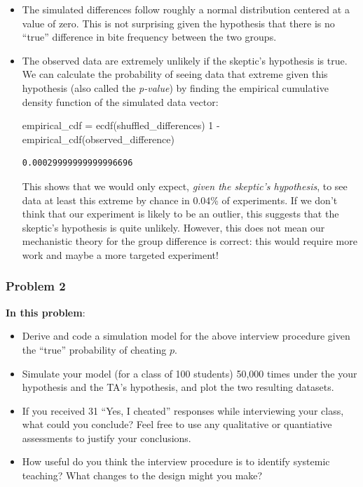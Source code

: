 \documentclass[
  letterpaper,
  DIV=11,
  numbers=noendperiod]{scrartcl}
\newenvironment{Shaded}{\begin{snugshade}}{\end{snugshade}}
\newcommand{\FloatTok}[1]{\textcolor[rgb]{0.68,0.00,0.00}{#1}}
\newcommand{\FunctionTok}[1]{\textcolor[rgb]{0.28,0.35,0.67}{#1}}
\newcommand{\NormalTok}[1]{\textcolor[rgb]{0.00,0.23,0.31}{#1}}
\newcommand{\OperatorTok}[1]{\textcolor[rgb]{0.37,0.37,0.37}{#1}}
\providecommand{\tightlist}{%
  \setlength{\itemsep}{0pt}\setlength{\parskip}{0pt}}\usepackage{longtable,booktabs,array}
\begin{document}
\begin{itemize}
\item
  The simulated differences follow roughly a normal distribution
  centered at a value of zero. This is not surprising given the
  hypothesis that there is no ``true'' difference in bite frequency
  between the two groups.
\item
  The observed data are extremely unlikely if the skeptic's hypothesis
  is true. We can calculate the probability of seeing data that extreme
  given this hypothesis (also called the \emph{p-value}) by finding the
  empirical cumulative density function of the simulated data vector:

\begin{Shaded}
\begin{Highlighting}[]
\NormalTok{empirical\_cdf }\OperatorTok{=} \FunctionTok{ecdf}\NormalTok{(shuffled\_differences)}
\FloatTok{1} \OperatorTok{{-}} \FunctionTok{empirical\_cdf}\NormalTok{(observed\_difference)}
\end{Highlighting}
\end{Shaded}

\begin{verbatim}
0.00029999999999996696
\end{verbatim}

  This shows that we would only expect, \emph{given the skeptic's
  hypothesis}, to see data at least this extreme by chance in 0.04\% of
  experiments. If we don't think that our experiment is likely to be an
  outlier, this suggests that the skeptic's hypothesis is quite
  unlikely. However, this does not mean our mechanistic theory for the
  group difference is correct: this would require more work and maybe a
  more targeted experiment!
\end{itemize}

\subsubsection{Problem 2}\label{problem-2}

\textbf{In this problem}:

\begin{itemize}
\tightlist
\item
  Derive and code a simulation model for the above interview procedure
  given the ``true'' probability of cheating \(p\).
\item
  Simulate your model (for a class of 100 students) 50,000 times under
  the your hypothesis and the TA's hypothesis, and plot the two
  resulting datasets.
\item
  If you received 31 ``Yes, I cheated'' responses while interviewing
  your class, what could you conclude? Feel free to use any qualitative
  or quantiative assessments to justify your conclusions.
\item
  How useful do you think the interview procedure is to identify
  systemic teaching? What changes to the design might you make?
\end{itemize}
\end{document}
